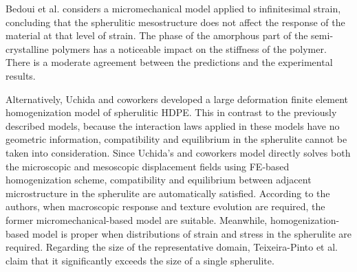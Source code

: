 Bedoui et al. \citep{bedouiMicromechanicalModelingIsotropic2006} considers a micromechanical model applied to infinitesimal strain, concluding that the spherulitic mesostructure does not affect the response of the material at that level of strain.
The phase of the amorphous part of the semi-crystalline polymers has a noticeable impact on the stiffness of the polymer.
There is a moderate agreement between the predictions and the experimental results.

Alternatively, Uchida and coworkers \citep{uchidaMicroMesoMacroscopic2013} developed a large deformation finite element homogenization model of spherulitic HDPE.
This in contrast to the previously described models, because the interaction laws applied in these models have no geometric information, compatibility and equilibrium in the spherulite cannot be taken into consideration.
Since Uchida's and coworkers model directly solves both the microscopic and mesoscopic displacement fields using FE-based homogenization scheme, compatibility and equilibrium between adjacent microstructure in the spherulite are automatically satisfied.
According to the authors, when macroscopic response and texture evolution are required, the former micromechanical-based model are suitable.
Meanwhile, homogenization-based model is proper when distributions of strain and stress in the spherulite are required.
Regarding the size of the representative domain, Teixeira-Pinto et al. \citep{teixeira-pintoSizeEstimationRepresentative2016} claim that it significantly exceeds the size of a single spherulite.


